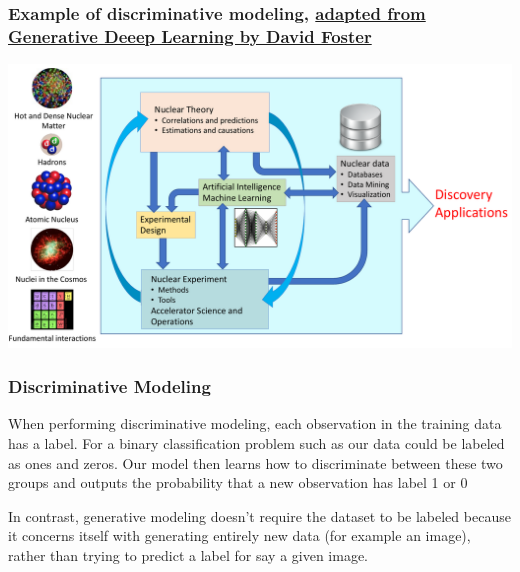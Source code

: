 \documentclass{beamer}
\begin{document}
\begin{frame}
\frametitle{Example of discriminative modeling, \href{{https://www.oreilly.com/library/view/generative-deep-learning/9781098134174/ch01.html}}{adapted from Generative Deeep Learning by David Foster}}

\vspace{6mm}

\centerline{\includegraphics[width=1.0\linewidth]{figures/ML-NP.pdf}}

\vspace{6mm}
\end{frame}

\begin{frame}
\frametitle{Discriminative Modeling}

When performing discriminative modeling, each observation in the
training data has a label. For a binary classification problem such as
our data could be labeled as ones and zeros. Our model then learns how to
discriminate between these two groups and outputs the probability that
a new observation has label 1 or 0

In contrast, generative modeling doesn’t require the dataset to be
labeled because it concerns itself with generating entirely new
data (for example an image), rather than trying to predict a label for say  a given image.
\end{frame}
\end{document}
